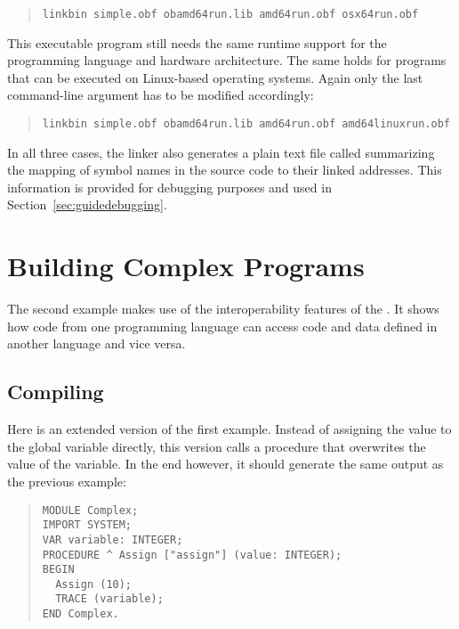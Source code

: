 \begin{quote}\begin{verbatim}
linkbin simple.obf obamd64run.lib amd64run.obf osx64run.obf
\end{verbatim}\end{quote}

This executable program still needs the same runtime support for the programming language and hardware architecture.
The same holds for programs that can be executed on Linux-based operating systems.
Again only the last command-line argument has to be modified accordingly:

\begin{quote}\begin{verbatim}
linkbin simple.obf obamd64run.lib amd64run.obf amd64linuxrun.obf
\end{verbatim}\end{quote}

In all three cases, the linker also generates a plain text file called  summarizing the mapping of symbol names in the source code to their linked addresses.
This information is provided for debugging purposes and used in Section~\ref{sec:guidedebugging}.

\section{Building Complex Programs}\label{sec:guidecomplex}

The second example makes use of the interoperability features of the \ecs{}.
It shows how code from one programming language can access code and data defined in another language and vice versa.

\subsection{Compiling}

Here is an extended version of the first example.
Instead of assigning the value to the global variable directly, this version calls a procedure that overwrites the value of the variable.
In the end however, it should generate the same output as the previous example:

\begin{quote}\begin{verbatim}
MODULE Complex;
IMPORT SYSTEM;
VAR variable: INTEGER;
PROCEDURE ^ Assign ["assign"] (value: INTEGER);
BEGIN
  Assign (10);
  TRACE (variable);
END Complex.
\end{verbatim}\end{quote}

